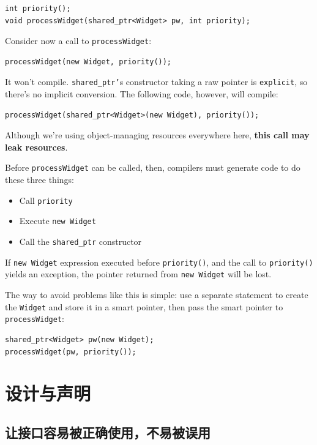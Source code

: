 \begin{verbatim}
int priority();
void processWidget(shared_ptr<Widget> pw, int priority);
\end{verbatim}

Consider now a call to \texttt{processWidget}:
\begin{verbatim}
processWidget(new Widget, priority());
\end{verbatim}

It won't compile. \texttt{shared\_ptr'}s constructor taking a raw
pointer is \texttt{explicit}, so there's no implicit conversion. The
following code, however, will compile: 
\begin{verbatim}
processWidget(shared_ptr<Widget>(new Widget), priority());
\end{verbatim}

Although we're using object-managing resources everywhere here,
\textbf{this call may leak resources}.

Before \texttt{processWidget} can be called, then, compilers must generate
code to do these three things:
\begin{itemize}
\item Call \texttt{priority}
\item Execute \texttt{new Widget}
\item Call the \texttt{shared\_ptr} constructor
\end{itemize}

If \texttt{new Widget} expression executed before \texttt{priority()},
and  the call to \texttt{priority()} yields an exception, the pointer
returned from \texttt{new Widget} will be lost.

The way to avoid problems like this is simple: use a separate
statement to create the \texttt{Widget} and store it in a smart pointer, then
pass the smart pointer to \texttt{processWidget}:

\begin{verbatim}
shared_ptr<Widget> pw(new Widget); 
processWidget(pw, priority());
\end{verbatim}

\clearpage
\section{设计与声明}

\subsection{让接口容易被正确使用，不易被误用}
\label{sec:Item-18}


